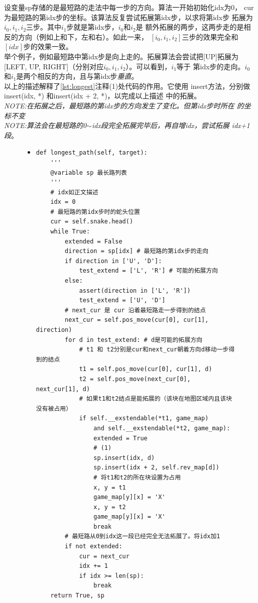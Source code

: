 \documentclass[a4paper]{article}
\begin{document}
设变量sp存储的是最短路的走法中每一步的方向。算法一开始初始化idx为0，
cur为最短路的第idx步的坐标。该算法反复尝试拓展第idx步，以求将第idx步
拓展为$i_0, i_1, i_2$三步。其中$i_1$步就是第idx步，$i_0$和$i_2$是
额外拓展的两步，这两步走的是相反的方向（例如上和下，左和右）。如此一来，
$[i_0, i_1, i_2]$三步的效果完全和$[idx]$步的效果一致。\\

举个例子，例如最短路中第idx步是向上走的。拓展算法会尝试把[UP]拓展为
[LEFT, UP, RIGHT]（分别对应$i_0, i_1, i_2$）。可以看到，$i_1$等于
第idx步的走向。$i_0$和$i_1$是两个相反的方向，且与第idx步\emph{垂直}。\\

以上的描述解释了\autoref{lst:longest}注释(1)处代码的作用。它使用
insert方法，分别做insert(idx, *) 和insert(idx + 2, *)，以完成以上描述
中的拓展。\\

\emph{NOTE:在拓展之后，最短路的第idx步的方向发生了变化。但第idx步时所在
的坐标不变}\\

\emph{NOTE:算法会在最短路的0$\sim$idx段完全拓展完毕后，再自增idx，尝试拓展
idx+1段}。
\begin{figure}[!hbt]
\begin{itemize}
\item[] \begin{lstlisting}[style=mypython, label=lst:longest, caption=最长路算法的实现]
def longest_path(self, target):
    '''
    @variable sp 最长路列表
    '''
    # idx如正文描述
    idx = 0
    # 最短路的第idx步时的蛇头位置
    cur = self.snake.head()
    while True:
        extended = False
        direction = sp[idx] # 最短路的第idx步的走向
        if direction in ['U', 'D']:
            test_extend = ['L', 'R'] # 可能的拓展方向
        else:
            assert(direction in ['L', 'R'])
            test_extend = ['U', 'D']
        # next_cur 是 cur 沿着最短路走一步得到的结点 
        next_cur = self.pos_move(cur[0], cur[1], direction)
        for d in test_extend: # d是可能的拓展方向
            # t1 和 t2分别是cur和next_cur朝着方向d移动一步得到的结点
            t1 = self.pos_move(cur[0], cur[1], d)
            t2 = self.pos_move(next_cur[0], next_cur[1], d)
            # 如果t1和t2结点是能拓展的（该块在地图区域内且该块没有被占用）
            if self.__exstendable(*t1, game_map) 
                and self.__exstendable(*t2, game_map):
                extended = True
                # (1)
                sp.insert(idx, d)
                sp.insert(idx + 2, self.rev_map[d])
                # 将t1和t2的所在块设置为占用
                x, y = t1
                game_map[y][x] = 'X'
                x, y = t2
                game_map[y][x] = 'X'
                break
        # 最短路从0到idx这一段已经完全无法拓展了。将idx加1
        if not extended:
            cur = next_cur
            idx += 1
            if idx >= len(sp):
                break
    return True, sp
\end{lstlisting}
\end{itemize}
\end{figure}
\end{document}
